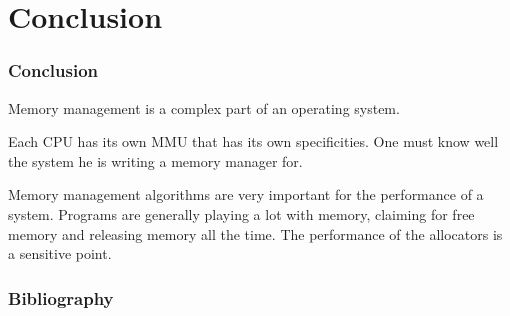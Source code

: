 \section{Conclusion}

\begin{frame}
  \frametitle{Conclusion}

  Memory management is a complex part of an operating system.

  \-

  Each CPU has its own MMU that has its own specificities. One must know well the system he is writing a memory manager for.

  \-

  Memory management algorithms are very important for the performance of a system. Programs are generally playing a lot with memory, claiming for free memory and releasing memory all the time. The performance of the allocators is a sensitive point.

\end{frame}

%
%

\begin{frame}[allowframebreaks]
  \frametitle{Bibliography}

  
  
\end{frame}


